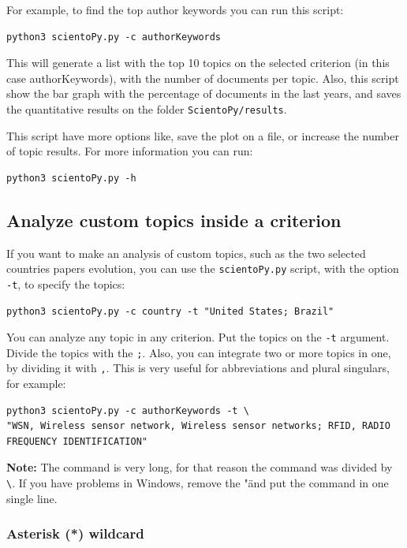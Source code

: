 \documentclass[10pt,letterpaper]{article}
\begin{document}
For example, to find the top author keywords you can run this script: 

\begin{verbatim}
python3 scientoPy.py -c authorKeywords
\end{verbatim}

This will generate a list with the top 10 topics on the selected criterion (in this case authorKeywords), with the number of documents per topic. Also, this script show the bar graph with the percentage of documents in the last years, and saves the quantitative results on the folder \verb|ScientoPy/results|. 

This script have more options like, save the plot on a file, or increase the number of topic results. For more information you can run:

\begin{verbatim}
python3 scientoPy.py -h
\end{verbatim}

\subsection{Analyze custom topics inside a criterion}

If you want to make an analysis of custom topics, such as the two selected countries papers evolution, you can use the \verb|scientoPy.py| script, with the option \verb|-t|, to specify the topics: 

\begin{verbatim}
python3 scientoPy.py -c country -t "United States; Brazil"
\end{verbatim}

You can analyze any topic in any criterion. Put the topics on the \verb|-t| argument. Divide the topics with the \verb|;|. Also, you can integrate two or more topics in one, by dividing it with \verb|,|. This is very useful for abbreviations and plural singulars, for example: 
\begin{verbatim}
python3 scientoPy.py -c authorKeywords -t \
"WSN, Wireless sensor network, Wireless sensor networks; RFID, RADIO FREQUENCY IDENTIFICATION"
\end{verbatim}

\textbf{Note: } The command is very long, for that reason the command was divided by \verb|\|. If you have problems in Windows, remove the "\" and put the command in one single line.

\subsubsection{Asterisk (*) wildcard}
\end{document}
